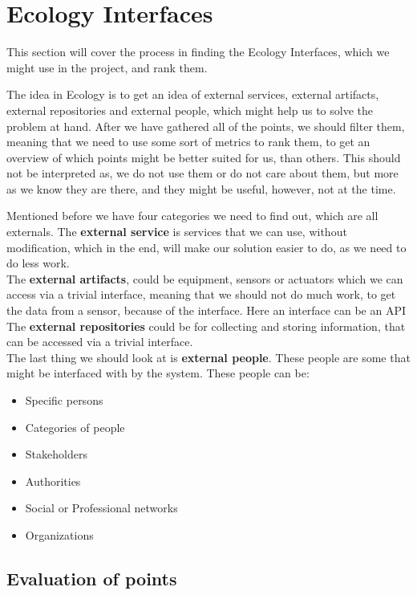 \section{Ecology Interfaces}
This section will cover the process in finding the Ecology Interfaces, which we might use in the project, and rank them.

The idea in Ecology is to get an idea of external services, external artifacts, external repositories and external people, which might help us to solve the problem at hand.
After we have gathered all of the points, we should filter them, meaning that we need to use some sort of metrics to rank them, to get an overview of which points might be better suited for us, than others.
This should not be interpreted as, we do not use them or do not care about them, but more as we know they are there, and they might be useful, however, not at the time.

Mentioned before we have four categories we need to find out, which are all externals.
The \textbf{external service} is services that we can use, without modification, which in the end, will make our solution easier to do, as we need to do less work.\\
The \textbf{external artifacts}, could be equipment, sensors or actuators which we can access via a trivial interface, meaning that we should not do much work, to get the data from a sensor, because of the interface.
Here an interface can be an API\\
The \textbf{external repositories} could be for collecting and storing information, that can be accessed via a trivial interface.\\
The last thing we should look at is \textbf{external people}.
These people are some that might be interfaced with by the system.
These people can be:

\begin{itemize}
    \item Specific persons
    \item Categories of people
    \item Stakeholders
    \item Authorities
    \item Social or Professional networks
    \item Organizations
\end{itemize}

\subsection{Evaluation of points}


